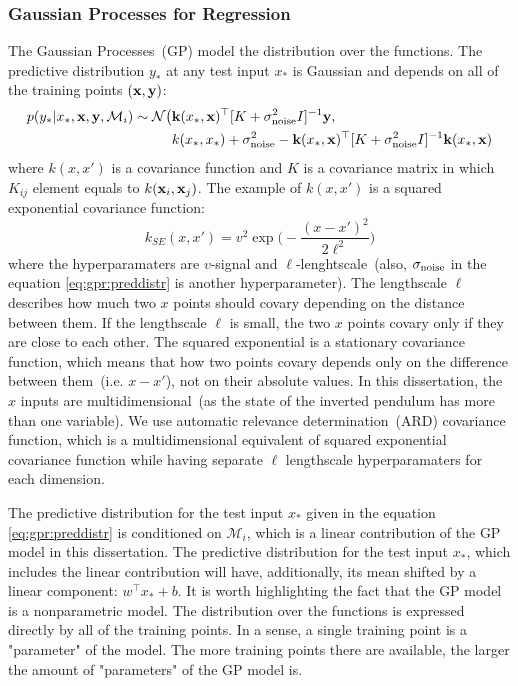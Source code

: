 \subsubsection{Gaussian Processes for Regression}
\label{s:pilco:gpr}
The Gaussian Processes\ (GP) model the distribution over the functions. The predictive distribution $y_*$ at any test input $x_{*}$ is Gaussian and depends on all of the training points $({\bf x}, {\bf y})$:
\begin{equation} \label{eq:gpr:preddistr}
\begin{split}
p(y_*|x_*,{\bf x},{\bf y}, \mathcal{M}_i) \sim {\cal N}\big(&{\bf k}(x_*,{\bf x})^\top [K+\sigma_{\rm noise}^2I]^{-1}{ \bf y}, \\
& k(x_*,x_*)+\sigma_{\rm noise}^2-{\bf k}(x_*,{\bf x})^\top [K+\sigma_{\rm noise}^2I]^{-1}{\bf k}(x_*,{\bf x})
\end{split}
\end{equation}
where $k(x,x')$ is a covariance function and $K$ is a covariance matrix in which $K_{ij}$ element equals to $k({\bf x}_{i}, {\bf x}_{j})$. The example of $k(x,x')$ is a squared exponential covariance function:
\begin{equation} \label{eq:gpr:covse}
k_{SE}(x,x') = v^2\exp\big(-\displaystyle\frac{(x-x')^2}{2\ell^2}\big)
\end{equation}
where the hyperparamaters are $v$-signal and $\ell$-lenghtscale\ (also, $\sigma_{\rm noise}$ in the equation \ref{eq:gpr:preddistr} is another hyperparameter).  The lengthscale $\ell$ describes how much two $x$ points should covary depending on the distance between them. If the lengthscale $\ell$ is small, the two $x$ points covary only if they are close to each other. The squared exponential is a stationary covariance function, which means that how two points covary depends only on the difference between them\ (i.e. $x-x'$), not on their absolute values. In this dissertation, the $x$ inputs are multidimensional\ (as the state of the inverted pendulum has more than one variable). We use automatic relevance determination\ (ARD) covariance function, which is a multidimensional equivalent of squared exponential covariance function while having separate $\ell$ lengthscale hyperparamaters for each dimension. 

\noindent The predictive distribution for the test input $x_{*}$ given in the equation \ref{eq:gpr:preddistr} is conditioned on $\mathcal{M}_i$, which is a linear contribution of the GP model in this dissertation. The predictive distribution for the test input $x_{*}$, which includes the linear contribution will have, additionally, its mean shifted by a linear component: $w^\top x_{*}+b$.  It is worth highlighting the fact that the GP model is a nonparametric model. The distribution over the functions is expressed directly by all of the training points.  In a sense, a single training point is a "parameter" of the model. The more training points there are available, the larger the amount of "parameters" of the GP model is.


